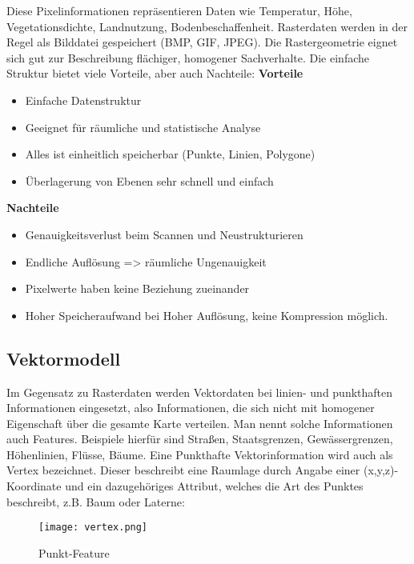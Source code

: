 \documentclass[11pt,fleqn]{book}
\begin{document}
Diese Pixelinformationen repräsentieren Daten wie  Temperatur, Höhe, Vegetationsdichte, Landnutzung, Bodenbeschaffenheit. Rasterdaten werden in der Regel als Bilddatei gespeichert (BMP, GIF, JPEG).
\newline
Die Rastergeometrie eignet sich gut zur Beschreibung flächiger, homogener Sachverhalte. Die einfache Struktur bietet viele Vorteile, aber auch Nachteile: \newline
\textbf{Vorteile}
\begin{itemize}
\item Einfache Datenstruktur 
\item Geeignet für räumliche und statistische Analyse
\item Alles ist einheitlich speicherbar (Punkte, Linien, Polygone)
\item Überlagerung von Ebenen sehr schnell und einfach
\end{itemize}
\textbf{Nachteile}
\begin{itemize}
\item Genauigkeitsverlust beim Scannen und Neustrukturieren
\item Endliche Auflösung => räumliche Ungenauigkeit
\item Pixelwerte haben keine Beziehung zueinander
\item Hoher Speicheraufwand bei Hoher Auflösung, keine Kompression möglich.
\end{itemize}

\subsection{Vektormodell}
Im Gegensatz zu Rasterdaten werden Vektordaten bei linien- und punkthaften Informationen eingesetzt, also Informationen, die sich nicht mit homogener Eigenschaft über die gesamte Karte verteilen. Man nennt solche Informationen auch Features. Beispiele hierfür sind Straßen, Staatsgrenzen, Gewässergrenzen, Höhenlinien, Flüsse, Bäume.
\newline
Eine Punkthafte Vektorinformation wird auch als Vertex bezeichnet. Dieser beschreibt eine Raumlage durch Angabe einer (x,y,z)-Koordinate und ein dazugehöriges Attribut, welches die Art des Punktes beschreibt, z.B. Baum oder Laterne:

\begin{figure}[h]
\centering
\texttt{[image: vertex.png]}
\caption{Punkt-Feature \protect\footnotemark}
\end{figure}
\end{document}
